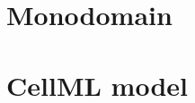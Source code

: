 \documentclass[
10pt, %
a4paper, %
oneside, %
headinclude,footinclude, %
BCOR5mm, %
]{scrartcl}
\begin{document}
\section{Monodomain}
%


%
%
\clearpage
%
\section{CellML model}
%
%
%
%
%
\clearpage
%


\end{document}
